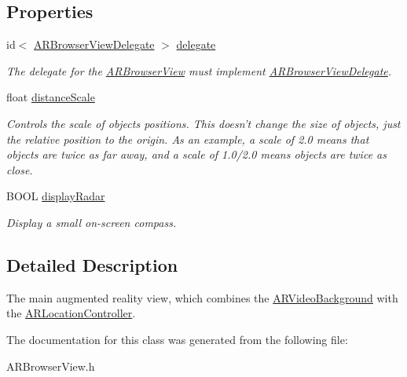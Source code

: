 \subsection*{Properties}
\begin{DoxyCompactItemize}
\item 
\hypertarget{interface_a_r_browser_view_ac71040f5d7529f5d1585f774524e6e48}{
id$<$ \hyperlink{protocol_a_r_browser_view_delegate-p}{ARBrowserViewDelegate} $>$ \hyperlink{interface_a_r_browser_view_ac71040f5d7529f5d1585f774524e6e48}{delegate}}
\label{interface_a_r_browser_view_ac71040f5d7529f5d1585f774524e6e48}

\begin{DoxyCompactList}\small\item\em The delegate for the \hyperlink{interface_a_r_browser_view}{ARBrowserView} must implement \hyperlink{protocol_a_r_browser_view_delegate-p}{ARBrowserViewDelegate}. \end{DoxyCompactList}\item 
\hypertarget{interface_a_r_browser_view_a91aef66437e470e8f51b90f5f2ec613c}{
float \hyperlink{interface_a_r_browser_view_a91aef66437e470e8f51b90f5f2ec613c}{distanceScale}}
\label{interface_a_r_browser_view_a91aef66437e470e8f51b90f5f2ec613c}

\begin{DoxyCompactList}\small\item\em Controls the scale of objects positions. This doesn't change the size of objects, just the relative position to the origin. As an example, a scale of 2.0 means that objects are twice as far away, and a scale of 1.0/2.0 means objects are twice as close. \end{DoxyCompactList}\item 
\hypertarget{interface_a_r_browser_view_a541177be5371872bc4153d8eb8805ff2}{
BOOL \hyperlink{interface_a_r_browser_view_a541177be5371872bc4153d8eb8805ff2}{displayRadar}}
\label{interface_a_r_browser_view_a541177be5371872bc4153d8eb8805ff2}

\begin{DoxyCompactList}\small\item\em Display a small on-\/screen compass. \end{DoxyCompactList}\end{DoxyCompactItemize}


\subsection{Detailed Description}
The main augmented reality view, which combines the \hyperlink{interface_a_r_video_background}{ARVideoBackground} with the \hyperlink{interface_a_r_location_controller}{ARLocationController}. 

The documentation for this class was generated from the following file:\begin{DoxyCompactItemize}
\item 
ARBrowserView.h\end{DoxyCompactItemize}
